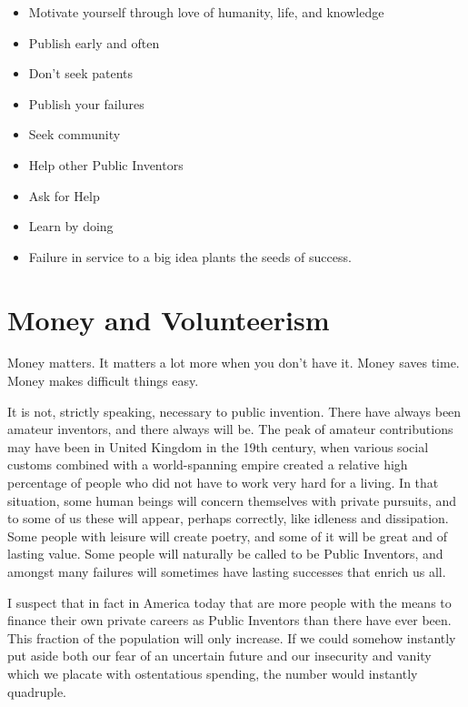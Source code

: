 \documentclass[
	fontsize=10pt, %
	twoside=false, %
	secnumdepth=1, %
]{kaobook}
\begin{document}

\begin{itemize}
\item Motivate yourself through love of humanity, life, and knowledge
\item Publish early and often
\item Don’t seek patents
\item Publish your failures
\item Seek community
\item Help other Public Inventors
\item Ask for Help
\item Learn by doing
\item Failure in service to a big idea plants the seeds of success.
\end{itemize}

\chapter{Money and Volunteerism}

Money matters. It matters a lot more when you don't have it.
Money saves time. Money makes difficult things easy.

It is not, strictly speaking, necessary to public invention.
There have always been amateur inventors, and there always will be.
The peak of amateur contributions may have been in United Kingdom in the
19th century, when various social customs combined with a world-spanning
empire created a relative high percentage of people who did not have
to work very hard for a living. In that situation, some human beings
will concern themselves with private pursuits, and to some of us
these will appear, perhaps correctly, like idleness and dissipation.
Some people with leisure will create poetry,
and some of it will be great and of lasting value.
Some people will naturally be called to be Public Inventors, and
amongst many failures will sometimes have lasting successes
that enrich us all.

I suspect that in fact in America today that are more people
with the means to finance their own private careers as Public Inventors
than there have ever been. This fraction of the population will
only increase. If we could somehow instantly put aside both our
fear of an uncertain future and our insecurity and vanity which
we placate with ostentatious spending, the number would instantly
quadruple.
\end{document}
